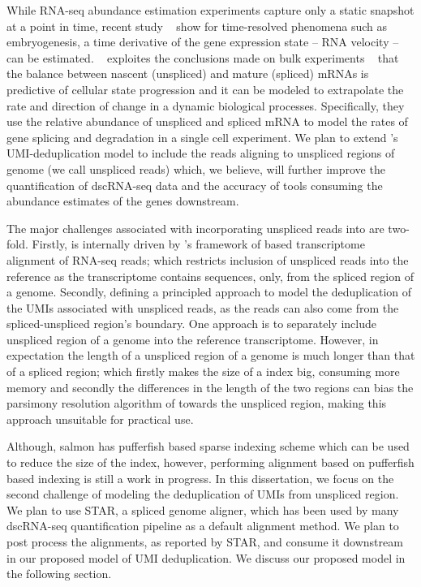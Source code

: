 While RNA-seq abundance estimation experiments capture only a static snapshot at a point in time, 
recent study ~\citep{la2018rna} show for time-resolved phenomena such as embryogenesis, a time derivative of 
the gene expression state -- RNA velocity -- can be estimated. ~\cite{la2018rna} exploites the 
conclusions made on bulk experiments ~\citep{zeisel2011coupled} that the balance between nascent (unspliced) and mature 
(spliced) mRNAs is predictive of cellular state progression and it can be modeled to extrapolate the 
rate and direction of change in a dynamic biological processes. Specifically, they use the relative 
abundance of unspliced and spliced mRNA to model the rates of gene splicing and degradation in a
single cell experiment. We plan to extend \alevin's UMI-deduplication model to include the reads 
aligning to unspliced regions of genome (we call unspliced reads) which, we believe, 
will further improve the quantification of dscRNA-seq data and the accuracy of tools consuming
the abundance estimates of the genes downstream.

The major challenges associated with incorporating unspliced reads into \alevin are two-fold.
Firstly, \alevin is internally driven by \salmon's framework of \rapmap based transcriptome 
alignment of RNA-seq reads; which restricts inclusion of unspliced reads into the reference 
as the transcriptome contains sequences, only, from the spliced region of a genome. 
Secondly, defining a principled approach to model the deduplication of the UMIs associated 
with unspliced reads, as the reads can also come from the spliced-unspliced region's boundary. 
One \naive approach is to separately include unspliced region of a genome into the reference 
transcriptome. However, in expectation the length of a unspliced region of a genome is much 
longer than that of a spliced region; which firstly makes the size of a \salmon index big, 
consuming more memory and secondly the differences in the length of the two regions can bias 
the parsimony resolution algorithm of \alevin towards the unspliced region, making this 
\naive approach unsuitable for practical use.

Although, salmon has pufferfish based sparse indexing scheme which can be used to reduce the 
size of the index, however, performing alignment based on pufferfish based indexing is 
still a work in progress. In this dissertation, we focus on the second challenge of modeling 
the deduplication of UMIs from unspliced region. We plan to use STAR, a spliced genome aligner, 
which has been used by many dscRNA-seq quantification pipeline as a default alignment method.
We plan to post process the alignments, as reported by STAR, and consume it downstream in
our proposed model of UMI deduplication. We discuss our proposed model in the following section.

